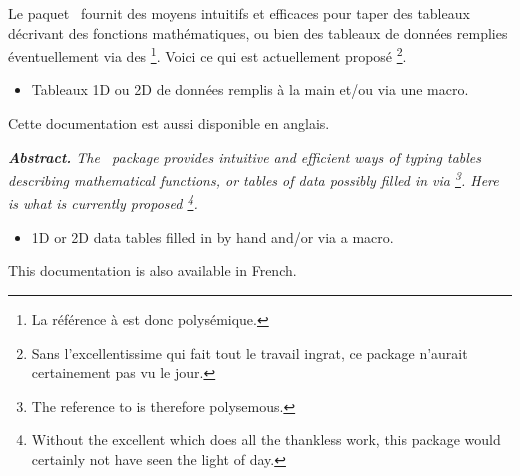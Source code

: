 \documentclass[10pt, a4paper]{article}
\begin{document}
\noindent
Le paquet \thispack\ fournit des moyens intuitifs et efficaces pour taper des tableaux décrivant des fonctions mathématiques, ou bien des tableaux de données remplies éventuellement via des 
\footnote{
	La référence à  est donc polysémique.
}.
Voici ce qui est actuellement proposé
\footnote{
	Sans l'excellentissime  qui fait tout le travail ingrat, ce package n'aurait certainement pas vu le jour.
}.
\begin{itemize}
	\item Tableaux 1D ou 2D de données remplis à la main et/ou via une macro.

%
%
\end{itemize}


\begin{tdocnote}
	Cette documentation est aussi disponible en anglais.
\end{tdocnote}




\tdocsep

{\noindent
\small\itshape
\textbf{Abstract.}
The \thispack\ package provides intuitive and efficient ways of typing tables describing mathematical functions, or tables of data possibly filled in via 
\footnote{
	The reference to  is therefore polysemous.
}.
Here is what is currently proposed
\footnote{
	Without the excellent  which does all the thankless work, this package would certainly not have seen the light of day.
}.
\begin{itemize}
	\item 1D or 2D data tables filled in by hand and/or via a macro.

%
%
\end{itemize}


\begin{tdocnote}
	This documentation is also available in French.
\end{tdocnote}
}
\end{document}
